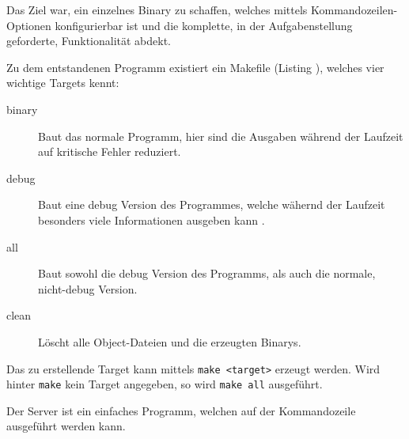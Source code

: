 Das Ziel war, ein einzelnes Binary zu schaffen, welches mittels Kommandozeilen-Optionen konfigurierbar ist und die komplette, in der Aufgabenstellung geforderte, Funktionalit\"{a}t abdekt.

\label{build}
Zu dem entstandenen Programm existiert ein Makefile (Listing ), welches vier wichtige Targets kennt:
\begin{description}
  \item[binary] Baut das normale Programm, hier sind die Ausgaben w\"{a}hrend der Laufzeit auf kritische Fehler reduziert. 
  \item[debug] Baut eine debug Version des Programmes, welche w\"{a}hernd der Laufzeit besonders viele Informationen ausgeben kann .
  \item[all] Baut sowohl die debug Version des Programms, als auch die normale, nicht-debug Version.
  \item[clean] L\"{o}scht alle Object-Dateien und die erzeugten Binarys. 
\end{description}
Das zu erstellende Target kann mittels \texttt{make <target>} erzeugt werden. Wird hinter \texttt{make} kein Target angegeben, so wird \texttt{make all} ausgef\"{u}hrt.



Der Server ist ein einfaches Programm, welchen auf der Kommandozeile ausgef\"{u}hrt werden kann.

